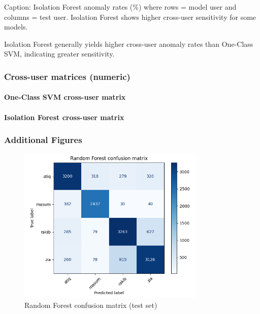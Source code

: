 \documentclass[
  11pt,
  a4paper,
]{article}
\begin{document}
Caption: Isolation Forest anomaly rates (\%) where rows = model user and
columns = test user. Isolation Forest shows higher cross-user
sensitivity for some models.

Isolation Forest generally yields higher cross-user anomaly rates than
One-Class SVM, indicating greater sensitivity.

\subsubsection{Cross-user matrices
(numeric)}\label{cross-user-matrices-numeric}

\paragraph{One-Class SVM cross-user
matrix}\label{one-class-svm-cross-user-matrix}

\paragraph{Isolation Forest cross-user
matrix}\label{isolation-forest-cross-user-matrix}

\subsubsection{Additional Figures}\label{additional-figures}

\begin{figure}
\centering
\includegraphics[width=0.8\textwidth,height=\textheight]{figures/rf_confusion_matrix.png}
\caption{Random Forest confusion matrix (test set)}
\end{figure}
\end{document}
